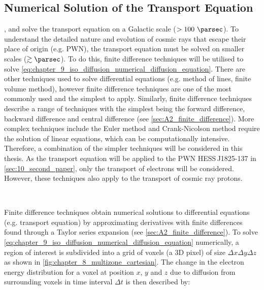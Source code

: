 \subsection{Numerical Solution of the Transport Equation} \label{sec:chapter_9_diffusion_numerical_sol}
\galprop, \dragon and \picard solve the transport equation on a Galactic scale ($>100~\pc$). To understand the detailed nature and evolution of cosmic rays that escape their place of origin (e.g. PWN), the transport equation must be solved on smaller scales ($\gtrsim \pc$). To do this, finite difference techniques will be utilised to solve \autoref{eq:chapter_9_iso_diffusion_numerical_diffusion_equation}. There are other techniques used to solve differential equations (e.g. method of lines, finite volume method), however finite difference techniques are one of the most commonly used and the simplest to apply. Similarly, finite difference techniques describe a range of techniques with the simplest being the forward difference, backward difference and central difference (see \autoref{sec:A2_finite_difference}). More complex techniques include the Euler method and Crank-Nicolson method require the solution of linear equations, which can be computationally intensive. Therefore, a combination of the simpler techniques will be considered in this thesis. As the transport equation will be applied to the PWN \mbox{HESS\,J1825-137} in \autoref{sec:10_second_paper}, only the transport of electrons will be considered. However, these techniques also apply to the transport of cosmic ray protons.
\par~\par
Finite difference techniques obtain numerical solutions to differential equations (e.g. transport equation) by approximating derivatives with finite differences found through a Taylor series expansion (see \autoref{sec:A2_finite_difference}). To solve \autoref{eq:chapter_9_iso_diffusion_numerical_diffusion_equation} numerically, a region of interest is subdivided into a grid of voxels (a 3D pixel) of size $\Delta x \Delta y \Delta z$ as shown in \autoref{fig:chapter_8_multizone_cartesian}. The change in the electron energy distribution for a voxel at position $x$, $y$ and $z$ due to diffusion from surrounding voxels in time interval $\Delta t$ is then described by:
